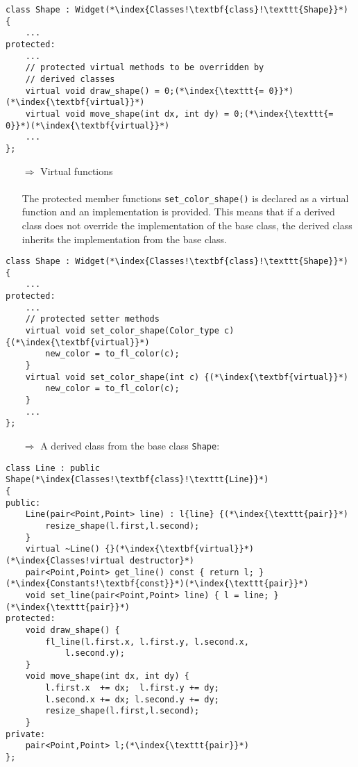 \documentclass[10pt]{book}
\begin{document}
\begin{lstlisting}
class Shape : Widget(*\index{Classes!\textbf{class}!\texttt{Shape}}*)
{
    ...
protected:
    ...
    // protected virtual methods to be overridden by 
    // derived classes
    virtual void draw_shape() = 0;(*\index{\texttt{= 0}}*)(*\index{\textbf{virtual}}*)
    virtual void move_shape(int dx, int dy) = 0;(*\index{\texttt{= 0}}*)(*\index{\textbf{virtual}}*)
    ...
};
\end{lstlisting}
\begin{enumerate}
\item[$\Rightarrow$] Virtual functions\\ \\ The protected member functions \texttt{set\_color\_shape()} is declared as a virtual function and an implementation is provided. This means that if a derived class does not override the implementation of the base class, the derived class inherits the implementation from the base class.
\end{enumerate}
\begin{lstlisting}
class Shape : Widget(*\index{Classes!\textbf{class}!\texttt{Shape}}*)
{
    ...
protected:
    ...
    // protected setter methods
    virtual void set_color_shape(Color_type c) {(*\index{\textbf{virtual}}*)
        new_color = to_fl_color(c);
    }
    virtual void set_color_shape(int c) {(*\index{\textbf{virtual}}*)
        new_color = to_fl_color(c);
    }
    ...
};
\end{lstlisting}
\begin{enumerate}
\item[$\Rightarrow$] A derived class from the base class \texttt{Shape}:
\end{enumerate}
\begin{lstlisting}
class Line : public Shape(*\index{Classes!\textbf{class}!\texttt{Line}}*)
{
public:
    Line(pair<Point,Point> line) : l{line} {(*\index{\texttt{pair}}*)
        resize_shape(l.first,l.second);
    }
    virtual ~Line() {}(*\index{\textbf{virtual}}*)(*\index{Classes!virtual destructor}*)
    pair<Point,Point> get_line() const { return l; }(*\index{Constants!\textbf{const}}*)(*\index{\texttt{pair}}*)
    void set_line(pair<Point,Point> line) { l = line; }(*\index{\texttt{pair}}*)
protected:
    void draw_shape() {
        fl_line(l.first.x, l.first.y, l.second.x,
            l.second.y);
    }
    void move_shape(int dx, int dy) {
        l.first.x  += dx;  l.first.y += dy;
        l.second.x += dx; l.second.y += dy;
        resize_shape(l.first,l.second);
    }
private:
    pair<Point,Point> l;(*\index{\texttt{pair}}*)
};
\end{lstlisting}
\end{document}
